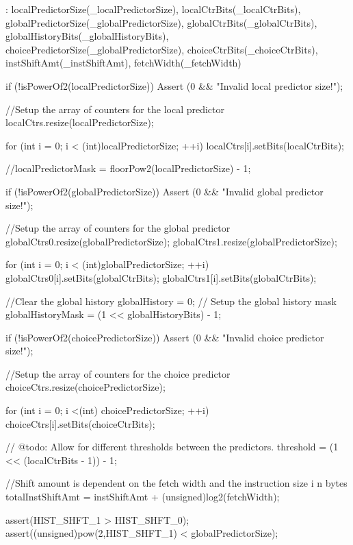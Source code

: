 \begin{DoxyCode}
    : localPredictorSize(_localPredictorSize),
      localCtrBits(_localCtrBits),
      globalPredictorSize(_globalPredictorSize),
      globalCtrBits(_globalCtrBits),
      globalHistoryBits(_globalHistoryBits),
      choicePredictorSize(_globalPredictorSize),
      choiceCtrBits(_choiceCtrBits),
      instShiftAmt(_instShiftAmt),
      fetchWidth(_fetchWidth)
{
    if (!isPowerOf2(localPredictorSize)) {
        Assert (0 && "Invalid local predictor size!\n");
    }

    //Setup the array of counters for the local predictor
    localCtrs.resize(localPredictorSize);

    for (int i = 0; i < (int)localPredictorSize; ++i)
        localCtrs[i].setBits(localCtrBits);

    //localPredictorMask = floorPow2(localPredictorSize) - 1;

    if (!isPowerOf2(globalPredictorSize)) {
        Assert (0 && "Invalid global predictor size!\n");
    }

    //Setup the array of counters for the global predictor
    globalCtrs0.resize(globalPredictorSize);
    globalCtrs1.resize(globalPredictorSize);

    for (int i = 0; i < (int)globalPredictorSize; ++i) {
        globalCtrs0[i].setBits(globalCtrBits);
        globalCtrs1[i].setBits(globalCtrBits);
        }

    //Clear the global history
    globalHistory = 0;
    // Setup the global history mask
    globalHistoryMask = (1 << globalHistoryBits) - 1;

    if (!isPowerOf2(choicePredictorSize)) {
        Assert (0 && "Invalid choice predictor size!\n");
    }

    //Setup the array of counters for the choice predictor
    choiceCtrs.resize(choicePredictorSize);

    for (int i = 0; i <(int) choicePredictorSize; ++i)
        choiceCtrs[i].setBits(choiceCtrBits);

    // @todo: Allow for different thresholds between the predictors.
    threshold = (1 << (localCtrBits - 1)) - 1;

        //Shift amount is dependent on the fetch width and the instruction size i
      n bytes
        totalInstShiftAmt = instShiftAmt + (unsigned)log2(fetchWidth);

        assert(HIST_SHFT_1 > HIST_SHFT_0);
        assert((unsigned)pow(2,HIST_SHFT_1) < globalPredictorSize);
}
\end{DoxyCode}


